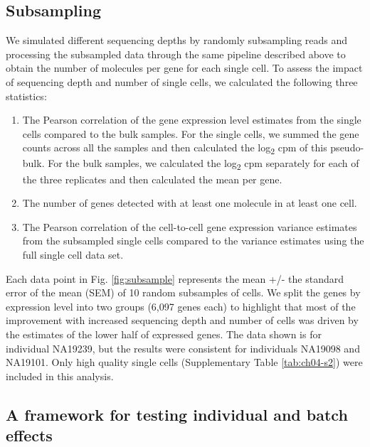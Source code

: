 \subsection{Subsampling}\label{subsampling}

We simulated different sequencing depths by randomly subsampling reads
and processing the subsampled data through the same pipeline described
above to obtain the number of molecules per gene for each single cell.
To assess the impact of sequencing depth and number of single cells,
we calculated the following three statistics:

\begin{enumerate}
\def\labelenumi{\arabic{enumi}.}  \itemsep1pt\parskip0pt
\item
  The Pearson correlation of the gene expression level estimates from
  the single cells compared to the bulk samples. For the single cells,
  we summed the gene counts across all the samples and then calculated
  the log\textsubscript{2} cpm of this pseudo-bulk. For the bulk
  samples, we calculated the log\textsubscript{2} cpm separately for
  each of the three replicates and then calculated the mean per gene.
\item
  The number of genes detected with at least one molecule in at least
  one cell.
\item
  The Pearson correlation of the cell-to-cell gene expression variance
  estimates from the subsampled single cells compared to the variance
  estimates using the full single cell data set.
\end{enumerate}

Each data point in Fig. \ref{fig:subsample} represents the mean +/-
the standard error of the mean (SEM) of 10 random subsamples of
cells. We split the genes by expression level into two groups (6,097
genes each) to highlight that most of the improvement with increased
sequencing depth and number of cells was driven by the estimates of
the lower half of expressed genes.  The data shown is for individual
NA19239, but the results were consistent for individuals NA19098 and
NA19101. Only high quality single cells (Supplementary Table
\ref{tab:ch04-s2}) were included in this analysis.

\subsection{A framework for testing individual and batch
effects}\label{a-framework-for-testing-individual-and-batch-effects}

